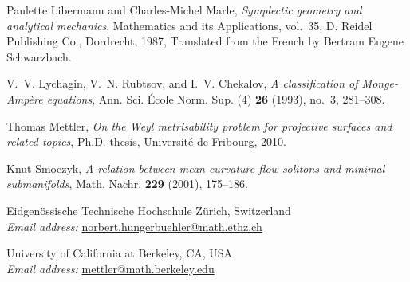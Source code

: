 \documentclass[11pt,letterpaper]{amsart}
\theoremstyle{definition}
\numberwithin{equation}{section}
\begin{document}
\begin{thebibliography}{10}
Paulette Libermann and Charles-Michel Marle, \emph{Symplectic geometry and
  analytical mechanics}, Mathematics and its Applications, vol.~35, D. Reidel
  Publishing Co., Dordrecht, 1987, Translated from the French by Bertram Eugene
  Schwarzbach. 

V.~V. Lychagin, V.~N. Rubtsov, and I.~V. Chekalov, \emph{A classification of
  {M}onge-{A}mp\`ere equations}, Ann. Sci. \'Ecole Norm. Sup. (4) \textbf{26}
  (1993), no.~3, 281--308. 

Thomas Mettler, \emph{On the {W}eyl metrisability problem for projective
  surfaces and related topics}, {P}h.{D}. thesis, {U}niversit\'e de {F}ribourg,
  2010.

Knut Smoczyk, \emph{A relation between mean curvature flow solitons and minimal
  submanifolds}, Math. Nachr. \textbf{229} (2001), 175--186. 

\end{thebibliography}

\flushleft

\small
\vspace{0.5cm}
\sc
Eidgen\"ossische Technische Hochschule Z\"urich, Switzerland\\
\vspace{0.1cm}
\textit{Email address:} \rm \href{mailto:norbert.hungerbuehler@math.ethz.ch}{norbert.hungerbuehler@math.ethz.ch}

\vspace{0.25cm}
\sc
University of California at Berkeley, CA, USA\\
\vspace{0.1cm}
\textit{Email address:} \rm \href{mailto:mettler@math.berkeley.edu}{mettler@math.berkeley.edu}
\end{document}
